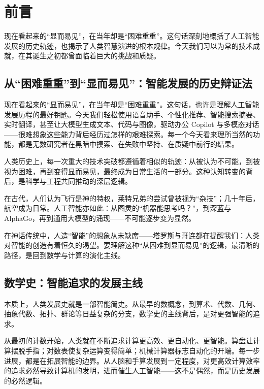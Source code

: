 \chapter*{ 前言}


\begin{introduction}

\item 现在看起来的“显而易见”，在当年却是“困难重重”。这句话深刻地概括了人工智能发展的历史轨迹，也揭示了人类智慧演进的根本规律。今天我们习以为常的技术成就，在其诞生之初都曾面临着巨大的挑战和质疑。

\end{introduction}

\section{从“困难重重”到“显而易见”：智能发展的历史辩证法}

现在看起来的“显而易见”，在当年却是“困难重重”。这句话，也许是理解人工智能发展历程的最好钥匙。今天我们轻松使用语音助手、个性化推荐、智能搜索摘要、实时翻译，甚至让大模型生成文本、代码与图像，驱动办公 Copilot 与多模态对话——很难想象这些能力背后经历过怎样的艰难探索。每一个今天看来理所当然的功能，都是无数研究者在黑暗中摸索、在失败中坚持、在质疑中前行的结果。

人类历史上，每一次重大的技术突破都遵循着相似的轨迹：从被认为不可能，到被视为困难，再到变得显而易见，最终成为日常生活的一部分。这种认知转变的背后，是科学与工程共同推动的深层逻辑。

在古代，人们认为飞行是神的特权，莱特兄弟的尝试曾被视为“杂技”；几十年后，航空成为日常。人工智能亦如此：从图灵的“机器能思考吗？”，到深蓝与AlphaGo，再到通用大模型的涌现——不可能逐步变为显然。

在神话传统中，人造“智能”的想象从未缺席——塔罗斯与哥连都在提醒我们：人类对智能的创造有着恒久的渴望。要理解这种“从困难到显而易见”的逻辑，最清晰的路径，是回到数学与计算的演化主线。

\section{数学史：智能追求的发展主线}

本质上，人类发展史就是一部智能简史。从最早的数概念，到算术、代数、几何、抽象代数、拓扑、群论等日益复杂的分支，数学史的主线背后，是对更强智能的追求。

从最初的计数开始，人类就在不断追求计算更高效、更自动化、更智能。算盘让计算摆脱手指；对数表使复杂运算变得简单；机械计算器标志自动化的开端。每一步进展，都是在拓展智能的边界。从人脑和手算发展到一定程度，对更高效计算效率的追求必然导致计算机的发明，进而催生人工智能——这不是偶然，而是历史发展的必然逻辑。

